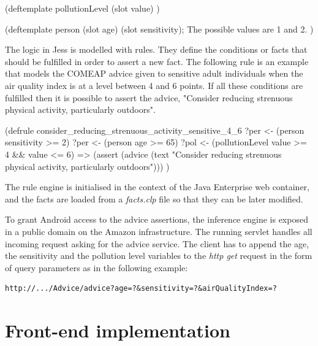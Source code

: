 {\centering
\begin{spverbatim}
(deftemplate pollutionLevel
    (slot value)
)

(deftemplate person
    (slot age)
    (slot sensitivity); The possible values are 1 and 2.
)
\end{spverbatim}
\par
}

The logic in Jess is modelled with rules. They define the conditions or facts that should be fulfilled in order to assert a new fact. The following rule is an example that models the COMEAP advice given to sensitive adult individuals when the air quality index is at a level between 4 and 6 points. If all these conditions are fulfilled then it is possible to assert the advice, "Consider reducing strenuous physical activity, particularly outdoors". 

{\centering
\begin{spverbatim}
(defrule consider_reducing_strenuous_activity_sensitive_4_6
    ?per <- (person {sensitivity >= 2})
    ?per <- (person {age >= 65})
    ?pol <- (pollutionLevel {value >= 4 && value <= 6})
    =>
    (assert
        (advice (text "Consider reducing strenuous physical activity, particularly outdoors")))
)
\end{spverbatim}
\par
}
The rule engine is initialised in the context of the Java Enterprise web container, and the facts are loaded from a \textit{facts.clp} file so that they can be later modified. 

To grant Android access to the advice assertions, the inference engine is exposed in a public domain on the Amazon infrastructure. The running servlet handles all incoming  request asking for the advice service. The client has to append the age, the sensitivity and the pollution level variables to the \textit{http get} request in the form of query parameters as in the following example: \bigskip

{\centering
\begin{BVerbatim}
http://.../Advice/advice?age=?&sensitivity=?&airQualityIndex=?
\end{BVerbatim}
\par
}

\section{Front-end implementation}
